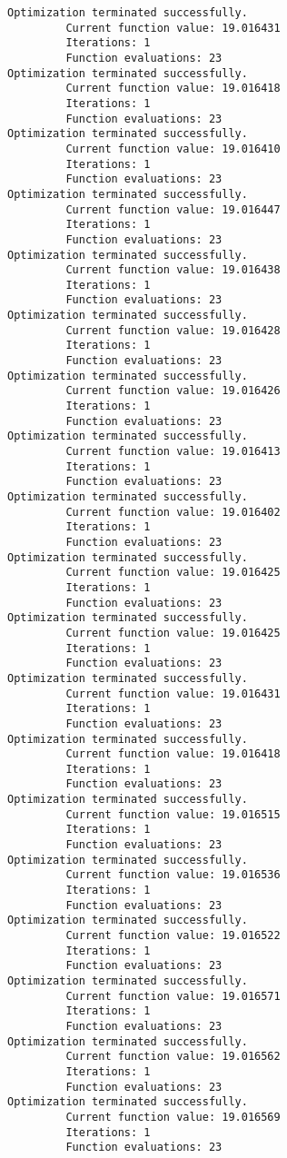 \documentclass[11pt]{article}
\begin{document}
\begin{Verbatim}[commandchars=\\\{\}]
Optimization terminated successfully.
         Current function value: 19.016431
         Iterations: 1
         Function evaluations: 23
Optimization terminated successfully.
         Current function value: 19.016418
         Iterations: 1
         Function evaluations: 23
Optimization terminated successfully.
         Current function value: 19.016410
         Iterations: 1
         Function evaluations: 23
Optimization terminated successfully.
         Current function value: 19.016447
         Iterations: 1
         Function evaluations: 23
Optimization terminated successfully.
         Current function value: 19.016438
         Iterations: 1
         Function evaluations: 23
Optimization terminated successfully.
         Current function value: 19.016428
         Iterations: 1
         Function evaluations: 23
Optimization terminated successfully.
         Current function value: 19.016426
         Iterations: 1
         Function evaluations: 23
Optimization terminated successfully.
         Current function value: 19.016413
         Iterations: 1
         Function evaluations: 23
Optimization terminated successfully.
         Current function value: 19.016402
         Iterations: 1
         Function evaluations: 23
Optimization terminated successfully.
         Current function value: 19.016425
         Iterations: 1
         Function evaluations: 23
Optimization terminated successfully.
         Current function value: 19.016425
         Iterations: 1
         Function evaluations: 23
Optimization terminated successfully.
         Current function value: 19.016431
         Iterations: 1
         Function evaluations: 23
Optimization terminated successfully.
         Current function value: 19.016418
         Iterations: 1
         Function evaluations: 23
Optimization terminated successfully.
         Current function value: 19.016515
         Iterations: 1
         Function evaluations: 23
Optimization terminated successfully.
         Current function value: 19.016536
         Iterations: 1
         Function evaluations: 23
Optimization terminated successfully.
         Current function value: 19.016522
         Iterations: 1
         Function evaluations: 23
Optimization terminated successfully.
         Current function value: 19.016571
         Iterations: 1
         Function evaluations: 23
Optimization terminated successfully.
         Current function value: 19.016562
         Iterations: 1
         Function evaluations: 23
Optimization terminated successfully.
         Current function value: 19.016569
         Iterations: 1
         Function evaluations: 23

\end{Verbatim}
\end{document}
